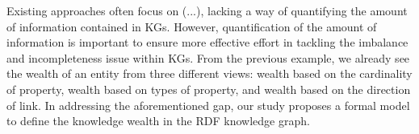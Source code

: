 


Existing approaches often focus on (...), lacking a way of quantifying the amount of information contained in KGs. However, quantification of the amount of information is important to ensure more effective effort in tackling the imbalance and incompleteness issue within KGs. From the previous example, we already see the wealth of an entity from three different views: wealth based on the cardinality of property, wealth based on types of property, and wealth based on the direction of link. In addressing the aforementioned gap, our study proposes a formal model to define the knowledge wealth in the RDF knowledge graph.


